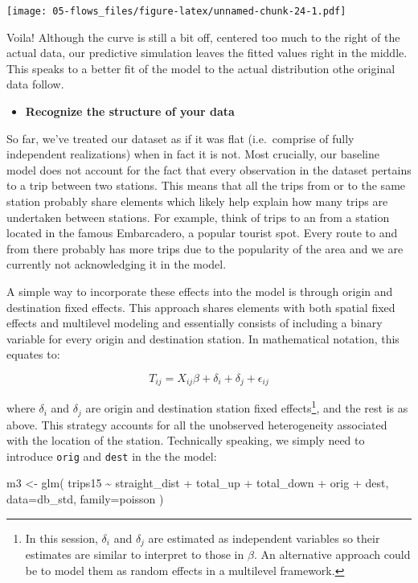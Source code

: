 \documentclass[
]{book}
\newenvironment{Shaded}{\begin{snugshade}}{\end{snugshade}}
\newcommand{\AttributeTok}[1]{\textcolor[rgb]{0.77,0.63,0.00}{#1}}
\newcommand{\FunctionTok}[1]{\textcolor[rgb]{0.00,0.00,0.00}{#1}}
\newcommand{\NormalTok}[1]{#1}
\newcommand{\OtherTok}[1]{\textcolor[rgb]{0.56,0.35,0.01}{#1}}
\newcommand{\StringTok}[1]{\textcolor[rgb]{0.31,0.60,0.02}{#1}}
\providecommand{\tightlist}{%
  \setlength{\itemsep}{0pt}\setlength{\parskip}{0pt}}
\begin{document}
\texttt{[image: 05-flows\_files/figure-latex/unnamed-chunk-24-1.pdf]}

Voila! Although the curve is still a bit off, centered too much to the right of the actual data, our predictive simulation leaves the fitted values right in the middle. This speaks to a better fit of the model to the actual distribution othe original data follow.

\begin{itemize}
\tightlist
\item
  \textbf{Recognize the structure of your data}
\end{itemize}

So far, we've treated our dataset as if it was flat (i.e.~comprise of fully independent realizations) when in fact it is not. Most crucially, our baseline model does not account for the fact that every observation in the dataset pertains to a trip between two stations. This means that all the trips from or to the same station probably share elements which likely help explain how many trips are undertaken between stations. For example, think of trips to an from a station located in the famous Embarcadero, a popular tourist spot. Every route to and from there probably has more trips due to the popularity of the area and we are currently not acknowledging it in the model.

A simple way to incorporate these effects into the model is through origin and destination fixed effects. This approach shares elements with both spatial fixed effects and multilevel modeling and essentially consists of including a binary variable for every origin and destination station. In mathematical notation, this equates to:

\[
T_{ij} = X_{ij}\beta + \delta_i + \delta_j + \epsilon_{ij}
\]

where \(\delta_i\) and \(\delta_j\) are origin and destination station fixed effects\footnote{In this session, \(\delta_i\) and \(\delta_j\) are estimated as independent variables so their estimates are similar to interpret to those in \(\beta\). An alternative approach could be to model them as random effects in a multilevel framework.}, and the rest is as above. This strategy accounts for all the unobserved heterogeneity associated with the location of the station. Technically speaking, we simply need to introduce \texttt{orig} and \texttt{dest} in the the model:

\begin{Shaded}
\begin{Highlighting}[]
\NormalTok{m3 }\OtherTok{\textless{}{-}} \FunctionTok{glm}\NormalTok{(}
  \StringTok{\textquotesingle{}trips15 \textasciitilde{} straight\_dist + total\_up + total\_down + orig + dest\textquotesingle{}}\NormalTok{, }
  \AttributeTok{data=}\NormalTok{db\_std,}
  \AttributeTok{family=}\NormalTok{poisson}
\NormalTok{)}
\end{Highlighting}
\end{Shaded}
\end{document}

